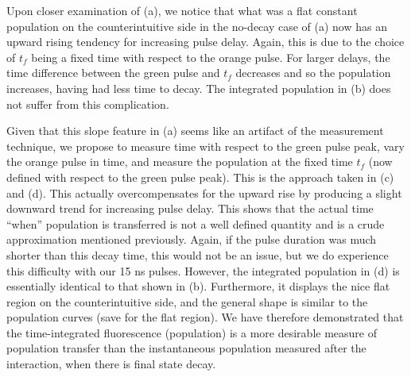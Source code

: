 Upon closer examination of (a), we notice that what was a flat
constant population on the counterintuitive side in the no-decay case of
(a) now has an upward rising tendency for increasing pulse delay.
Again, this is due to the choice of $t_f$ being a fixed time with respect to
the orange pulse.  For larger delays, the time difference between the green
pulse and $t_f$ decreases and so the population increases, having had less
time to decay.  The integrated population in (b) does not suffer
from this complication.

Given that this slope feature in (a) seems like an artifact of the
measurement technique, we propose to measure time with respect to
the green pulse peak, vary the orange pulse in time, and measure the population
at the fixed time $t_f$ (now defined with respect to the green pulse peak). 
This is the approach taken in (c) and
(d).  This actually overcompensates for the upward rise by
producing a slight downward trend for increasing pulse delay.  This shows that
the actual time ``when'' population is transferred is not a well defined
quantity and is a crude approximation mentioned previously.  Again, if the
pulse duration was much shorter than this decay time, this would not be an
issue, but we do experience this difficulty with our 15 ns pulses. 
However, the integrated population in (d) is essentially identical to
that shown in (b).  Furthermore, it displays the nice flat region on
the counterintuitive side, and the general shape is similar to the population
curves (save for the flat region).  We have therefore demonstrated that the
time-integrated fluorescence (population) is a more desirable measure of
population transfer than the instantaneous population measured after
the interaction, when there is final state decay.

\begin{figure}[tbp]
\bigskip
{}
\end{figure}

